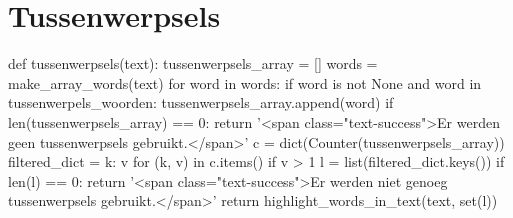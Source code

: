 \section{Tussenwerpsels}
\begin{python}
def tussenwerpsels(text):
    tussenwerpsels_array = []
    words = make_array_words(text)
    for word in words:
        if word is not None and word in tussenwerpels_woorden:
            tussenwerpsels_array.append(word)
    if len(tussenwerpsels_array) == 0:
        return '<span class="text-success">Er werden geen tussenwerpsels gebruikt.</span>'
    c = dict(Counter(tussenwerpsels_array))
    filtered_dict = {k: v for (k, v) in c.items() if v > 1}
    l = list(filtered_dict.keys())
    if len(l) == 0:
        return '<span class="text-success">Er werden niet genoeg tussenwerpsels gebruikt.</span>'
    return highlight_words_in_text(text, set(l))
\end{python}

